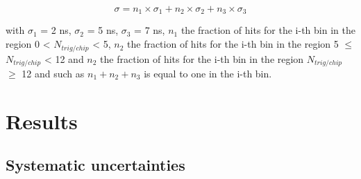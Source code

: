 \documentclass{JINST}
\begin{document}
\begin{equation}
  \sigma = n_1 \times \sigma_1 + n_2 \times \sigma_2 + n_3 \times \sigma_3 \label{eq:syst_nHits}
\end{equation}

with $\sigma_1$ = 2 ns, $\sigma_2$ = 5 ns, $\sigma_3$ = 7 ns, $n_1$ the fraction of hits for the i-th bin in the region 0 < $N_{trig/chip}$ < 5, $n_2$ the fraction of hits for the i-th bin in the region 5 $\leq$ $N_{trig/chip}$ < 12 and $n_2$ the fraction of hits for the i-th bin in the region $N_{trig/chip}$ $\geq$ 12 and such as $n_1 + n_2 + n_3$ is equal to one in the i-th bin.

\section{Results}

\subsection{Systematic uncertainties}
\label{sec:syst_uncert}
\end{document}
